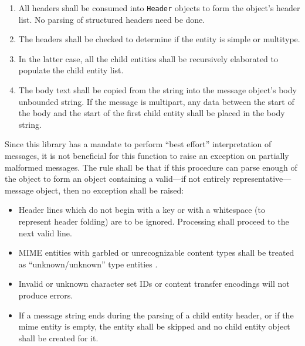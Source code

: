 \documentclass[11pt]{article}
\begin{document}
\begin{enumerate}

\item All headers shall be consumed into \texttt{Header} objects to
  form the object's header list. No parsing of structured headers need
  be done.

\item The headers shall be checked to determine if the entity is
  simple or multitype.

\item In the latter case, all the child entities shall be recursively
  elaborated to populate the child entity list.

\item The body text shall be copied from the string into the message
  object's body unbounded string. If the message is multipart, any
  data between the start of the body and the start of the first child
  entity shall be placed in the body string.
 
\end{enumerate}

Since this library has a mandate to perform ``best effort''
interpretation of messages, it is not beneficial for this function to
raise an exception on partially malformed messages. The rule shall be
that if this procedure can parse enough of the object to form an
object containing a valid---if not entirely representative---message
object, then no exception shall be raised:

\begin{itemize}

\item Header lines which do not begin with a key or with a whitespace
  (to represent header folding) are to be ignored. Processing shall
  proceed to the next valid line.

\item MIME entities with garbled or unrecognizable content types shall
  be treated as ``unknown/unknown'' type entities
  .

\item Invalid or unknown character set IDs or content transfer
  encodings will not produce errors.

\item If a message string ends during the parsing of a child entity
  header, or if the mime entity is empty, the entity shall be skipped
  and no child entity object shall be created for it.

\end{itemize} 
\end{document}
